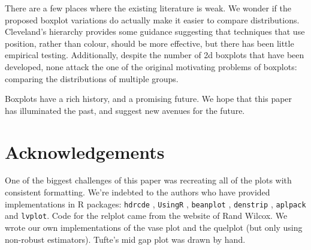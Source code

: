 \documentclass[oneside]{article}
\begin{document}
There are a few places where the existing literature is weak. We wonder if the proposed boxplot variations do actually make it easier to compare distributions. Cleveland's hierarchy \citep{cleveland:1984} provides some guidance suggesting that techniques that use position, rather than colour, should be more effective, but there has been little empirical testing. Additionally, despite the number of 2d boxplots that have been developed, none attack the one of the original motivating problems of boxplots: comparing the distributions of multiple groups.

Boxplots have a rich history, and a promising future. We hope that this paper has illuminated the past, and suggest new avenues for the future.

\section{Acknowledgements}
\label{sec:acknowledgements}

One of the biggest challenges of this paper was recreating all of the plots with consistent formatting. We're indebted to the authors who have provided implementations in R packages: {\tt hdrcde} \citep{hdrcde}, {\tt UsingR} \citep{UsingR}, {\tt beanplot} \citep{kampstra:2008}, {\tt denstrip} \citep{jackson:2008}, {\tt aplpack} \citep{aplpack} and {\tt lvplot}. Code for the relplot came from the website of Rand Wilcox. We wrote our own implementations of the vase plot and the quelplot (but only using non-robust estimators). Tufte's mid gap plot was drawn by hand.


\end{document}
